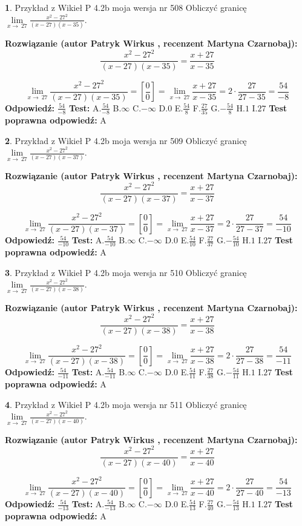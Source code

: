 \documentclass[12pt, a4paper]{article}
\theoremstyle{definition} %
\newtheorem{zad}{}
\newcommand{\zadStart}[1]{\begin{zad}#1\newline}
\newcommand{\zadStop}{\end{zad}}
\newcommand{\rozwStart}[2]{\noindent \textbf{Rozwiązanie (autor #1 , recenzent #2): }\newline}
\newcommand{\rozwStop}{\newline}
\newcommand{\odpStart}{\noindent \textbf{Odpowiedź:}\newline}
\newcommand{\odpStop}{\newline}
\newcommand{\testStart}{\noindent \textbf{Test:}\newline}
\newcommand{\testStop}{\newline}
\newcommand{\kluczStart}{\noindent \textbf{Test poprawna odpowiedź:}\newline}
\newcommand{\kluczStop}{\newline}
\begin{document}
\zadStart{Przykład z Wikieł P 4.2b moja wersja nr 508}
Obliczyć granicę $\lim\limits_{x\to\ 27}\frac{x^{2}-27^{2}}{(x-27)(x-35)}$.
\zadStop
\rozwStart{Patryk Wirkus}{Martyna Czarnobaj}
$$\frac{x^{2}-27^{2}}{(x-27)(x-35)}=\frac{x+27}{x-35}$$

$$\lim\limits_{x\to\ 27}\frac{x^{2}-27^{2}}{(x-27)(x-35)}=[\frac{0}{0}]=\lim\limits_{x\to\ 27}\frac{x+27}{x-35}=2 \cdot \frac{27}{27-35} = \frac{54}{-8}$$
\rozwStop
\odpStart
$\frac{54}{-8}$
\odpStop
\testStart
A.$\frac{54}{-8}$
B.$\infty$
C.$-\infty$
D.$0$
E.$\frac{54}{8}$
F.$\frac{27}{35}$
G.$-\frac{54}{8}$
H.$1$
I.$27$
\testStop
\kluczStart
A
\kluczStop



\zadStart{Przykład z Wikieł P 4.2b moja wersja nr 509}
Obliczyć granicę $\lim\limits_{x\to\ 27}\frac{x^{2}-27^{2}}{(x-27)(x-37)}$.
\zadStop
\rozwStart{Patryk Wirkus}{Martyna Czarnobaj}
$$\frac{x^{2}-27^{2}}{(x-27)(x-37)}=\frac{x+27}{x-37}$$

$$\lim\limits_{x\to\ 27}\frac{x^{2}-27^{2}}{(x-27)(x-37)}=[\frac{0}{0}]=\lim\limits_{x\to\ 27}\frac{x+27}{x-37}=2 \cdot \frac{27}{27-37} = \frac{54}{-10}$$
\rozwStop
\odpStart
$\frac{54}{-10}$
\odpStop
\testStart
A.$\frac{54}{-10}$
B.$\infty$
C.$-\infty$
D.$0$
E.$\frac{54}{10}$
F.$\frac{27}{37}$
G.$-\frac{54}{10}$
H.$1$
I.$27$
\testStop
\kluczStart
A
\kluczStop



\zadStart{Przykład z Wikieł P 4.2b moja wersja nr 510}
Obliczyć granicę $\lim\limits_{x\to\ 27}\frac{x^{2}-27^{2}}{(x-27)(x-38)}$.
\zadStop
\rozwStart{Patryk Wirkus}{Martyna Czarnobaj}
$$\frac{x^{2}-27^{2}}{(x-27)(x-38)}=\frac{x+27}{x-38}$$

$$\lim\limits_{x\to\ 27}\frac{x^{2}-27^{2}}{(x-27)(x-38)}=[\frac{0}{0}]=\lim\limits_{x\to\ 27}\frac{x+27}{x-38}=2 \cdot \frac{27}{27-38} = \frac{54}{-11}$$
\rozwStop
\odpStart
$\frac{54}{-11}$
\odpStop
\testStart
A.$\frac{54}{-11}$
B.$\infty$
C.$-\infty$
D.$0$
E.$\frac{54}{11}$
F.$\frac{27}{38}$
G.$-\frac{54}{11}$
H.$1$
I.$27$
\testStop
\kluczStart
A
\kluczStop



\zadStart{Przykład z Wikieł P 4.2b moja wersja nr 511}
Obliczyć granicę $\lim\limits_{x\to\ 27}\frac{x^{2}-27^{2}}{(x-27)(x-40)}$.
\zadStop
\rozwStart{Patryk Wirkus}{Martyna Czarnobaj}
$$\frac{x^{2}-27^{2}}{(x-27)(x-40)}=\frac{x+27}{x-40}$$

$$\lim\limits_{x\to\ 27}\frac{x^{2}-27^{2}}{(x-27)(x-40)}=[\frac{0}{0}]=\lim\limits_{x\to\ 27}\frac{x+27}{x-40}=2 \cdot \frac{27}{27-40} = \frac{54}{-13}$$
\rozwStop
\odpStart
$\frac{54}{-13}$
\odpStop
\testStart
A.$\frac{54}{-13}$
B.$\infty$
C.$-\infty$
D.$0$
E.$\frac{54}{13}$
F.$\frac{27}{40}$
G.$-\frac{54}{13}$
H.$1$
I.$27$
\testStop
\kluczStart
A
\kluczStop
\end{document}
